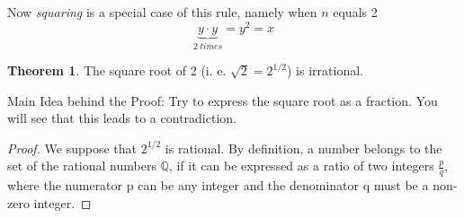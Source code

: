 \documentclass[11pt]{amsart}
\theoremstyle{definition}
\newtheorem{theorem}{Theorem}
\begin{document}
Now \emph{squaring} is a special case of this rule, namely when \(n\) equals 2
\begin{equation}
    \underbrace{y \cdot y}_{2 \; times} = y^{2} = x
\end{equation}

\begin{theorem}
    The square root of 2 (i. e. \( \sqrt{2} = 2^{1/2}\)) is irrational.
\end{theorem}
Main Idea behind the Proof: Try to express the square root as a fraction. You will see that this leads to a contradiction.
\begin{proof}
    We suppose that \(2^{1/2}\) is rational. By definition, a number belongs to the set of the rational numbers \(\mathbb{Q}\), if it can be expressed as a ratio of two integers  \(\frac{p}{q}\), where the numerator p can be any integer and the denominator q must be a non-zero integer.


\end{proof}
\end{document}
